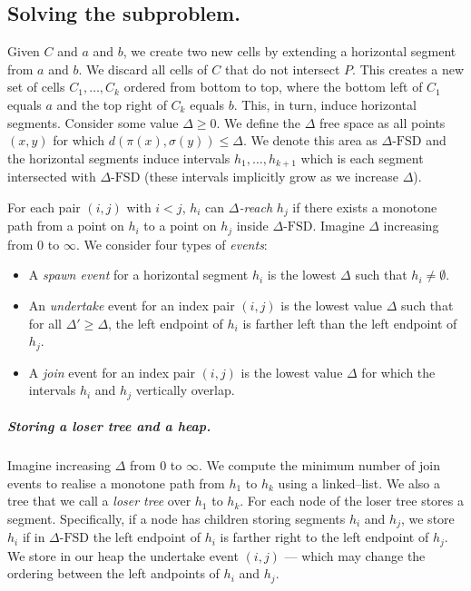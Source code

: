 \documentclass[10pt,a4paper]{article}
\newcommand{\dfs}{\Delta\text{-FSD}}
\begin{document}
\subsection{Solving the subproblem.}
Given $C$ and $a$ and $b$, we create two new cells by extending a horizontal segment from $a$ and $b$. We discard all cells of $C$ that do not intersect $P$. 
This creates a new set of cells $C_1, \ldots, C_k$ ordered from bottom to top, where the bottom left of $C_1$ equals $a$ and the top right of $C_k$ equals $b$. 
This, in turn,  induce horizontal segments. 
Consider some value $\Delta \geq 0$.
We define the $\Delta$ free space as all points $(x, y)$ for which $d(\pi(x), \sigma(y)) \leq \Delta$. We denote this area as $\dfs$ and the horizontal segments induce intervals  $h_1, \ldots, h_{k+1}$ which is each segment intersected with $\dfs$ (these intervals implicitly grow as we increase $\Delta$). 

For each pair $(i, j)$ with $i < j$, $h_i$ can \emph{$\Delta$-reach} $h_j$ if there exists a monotone path from a point on $h_i$ to a point on $h_j$ inside $\dfs$.
Imagine $\Delta$ increasing from $0$ to $\infty$.
We consider four types of \emph{events}:
\begin{itemize}
    \item A \emph{spawn event} for a horizontal segment $h_i$ is the lowest $\Delta$ such that $h_i \neq \emptyset$.
    \item An \emph{undertake} event for an index pair $(i, j)$ is the lowest value $\Delta$ such that for all $\Delta' \geq \Delta$, the left endpoint of $h_i$ is farther left than the left endpoint of $h_j$. 
    \item A \emph{join} event for an index pair $(i, j)$ is the lowest value $\Delta$ for which the intervals $h_i$ and $h_j$ vertically overlap. 
\end{itemize}



\subparagraph{Storing a loser tree and a heap.}
Imagine increasing $\Delta$ from $0$ to $\infty$. 
We compute the minimum number of join events to realise a monotone path from $h_1$ to $h_{k}$ using a linked–list.
We also a tree that we call a \emph{loser tree} over $h_1$ to $h_k$. 
For each node of the loser tree stores a segment.
Specifically, if a node has children storing segments $h_i$ and $h_j$, we store $h_i$ if in $\dfs$ the left endpoint of $h_i$ is farther right to the left endpoint of $h_j$. We store in our heap the undertake event $(i, j)$ --- which may change the ordering between the left andpoints of $h_i$ and $h_j$. 
\end{document}
